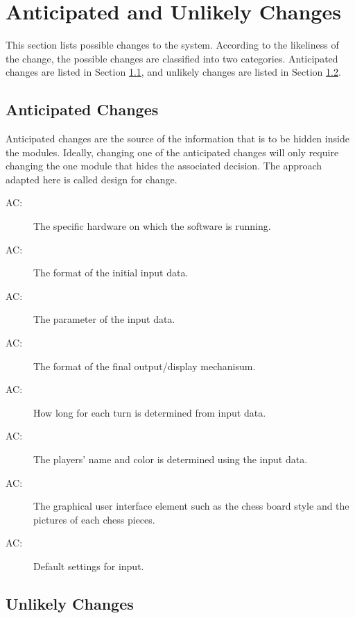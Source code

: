 \documentclass[12pt, titlepage]{article}
\newcounter{acnum}
\newcommand{\actheacnum}{AC\theacnum}
\begin{document}
\section{Anticipated and Unlikely Changes} \label{SecChange}

This section lists possible changes to the system. According to the likeliness
of the change, the possible changes are classified into two
categories. Anticipated changes are listed in Section \ref{SecAchange}, and
unlikely changes are listed in Section \ref{SecUchange}.


\subsection{Anticipated Changes} \label{SecAchange}

Anticipated changes are the source of the information that is to be hidden
inside the modules. Ideally, changing one of the anticipated changes will only
require changing the one module that hides the associated decision. The approach
adapted here is called design for
change.~\citep{Bokahari2018}

\begin{description}
\item[ \actheacnum \label{acHardware}:] The specific
  hardware on which the software is running.
\item[ \actheacnum \label{acInput}:] The format of the
  initial input data.
\item[ \actheacnum \label{acParams}:] The parameter of the input data.
\item[ \actheacnum \label{acOutput}:] The format of the final output/display mechanisum.
\item[ \actheacnum \label{acTime}:]  How long for each turn is determined from input data.
\item[ \actheacnum \label{acPlayers}:] The players' name and color is determined using the input data.
\item[ \actheacnum \label{acGUI}:] The graphical user interface element such as the chess board style and the pictures of each chess pieces.
\item[ \actheacnum \label{acDefault}:] Default settings for input.
\end{description}


\subsection{Unlikely Changes} \label{SecUchange}
\end{document}
